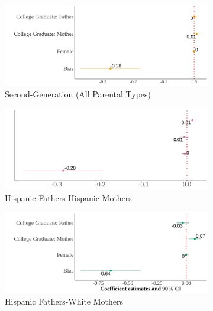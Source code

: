 \documentclass[12pt,english]{article}
\begin{document}
\begin{center}
\begin{figure}[!htb]
\centering
\caption{Relationship Between Self-Reported Hispanic Identity and Bias: By Parental Types MSA}
\label{plot01-regression-byparent}
\begin{subfigure}{.48\textwidth}
\caption{Second-Generation (All Parental Types)}
\centering
\includegraphics[width=.9\linewidth]{figure/msa-by-parents-regs-all.png}
\end{subfigure}
\centering
\begin{subfigure}{.48\textwidth}
\caption{Hispanic Fathers-Hispanic Mothers}
\centering
\includegraphics[width=.9\linewidth]{figure/msa-by-parents-regs-hh.png}
\end{subfigure}
\begin{subfigure}{.48\textwidth}
\caption{Hispanic Fathers-White Mothers}
\centering
\includegraphics[width=.9\linewidth]{figure/msa-by-parents-regs-hw.png}
\end{subfigure}
\begin{subfigure}{.48\textwidth}

\end{subfigure}
\end{figure}
\end{center}
\end{document}
